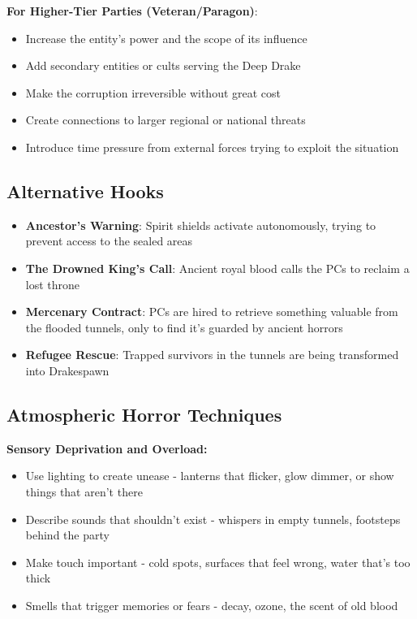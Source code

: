 \documentclass[11pt]{article}
\begin{document}
\begin{itemize}
\textbf{For Higher-Tier Parties (Veteran/Paragon)}:
\begin{itemize}
\item Increase the entity's power and the scope of its influence
\item Add secondary entities or cults serving the Deep Drake
\item Make the corruption irreversible without great cost
\item Create connections to larger regional or national threats
\item Introduce time pressure from external forces trying to exploit the situation
\end{itemize}

\subsection{Alternative Hooks}

\begin{itemize}
\item \textbf{Ancestor's Warning}: Spirit shields activate autonomously, trying to prevent access to the sealed areas
\item \textbf{The Drowned King's Call}: Ancient royal blood calls the PCs to reclaim a lost throne
\item \textbf{Mercenary Contract}: PCs are hired to retrieve something valuable from the flooded tunnels, only to find it's guarded by ancient horrors
\item \textbf{Refugee Rescue}: Trapped survivors in the tunnels are being transformed into Drakespawn
\end{itemize}

\subsection{Atmospheric Horror Techniques}

\textbf{Sensory Deprivation and Overload:}
\begin{itemize}
\item Use lighting to create unease - lanterns that flicker, glow dimmer, or show things that aren't there
\item Describe sounds that shouldn't exist - whispers in empty tunnels, footsteps behind the party
\item Make touch important - cold spots, surfaces that feel wrong, water that's too thick
\item Smells that trigger memories or fears - decay, ozone, the scent of old blood
\end{itemize}


\end{itemize}
\end{document}
